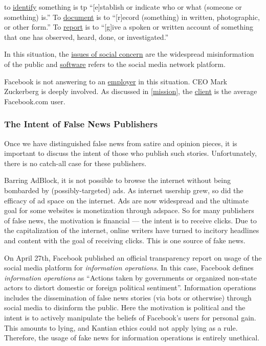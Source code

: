 to \ul{identify} something is tp ``[e]stablish or indicate who or what (someone or something) is.'' \cite{oxford} To \ul{document} is to ``[r]ecord (something) in written, photographic, or other form.'' \cite{oxford} To \ul{report} is to ``[g]ive a spoken or written account of something that one has observed, heard, done, or investigated.'' \cite{oxford}

\par In this situation, the \ul{issues of social concern} are the widespread misinformation of the public and \ul{software} refers to the social media network platform.

\par Facebook is not answering to an \ul{employer} in this situation. CEO Mark Zuckerberg is deeply involved. As discussed in \ref{mission}, the \ul{client} is the average Facebook.com user. 





\subsubsection{The Intent of False News Publishers}

\par Once we have distinguished false news from satire and opinion pieces, it is important to discuss the intent of those who publish such stories. Unfortunately, there is no catch-all case for these publishers.

\par Barring AdBlock, it is not possible to browse the internet without being bombarded by (possibly-targeted) ads. As internet usership grew, so did the efficacy of ad space on the internet. Ads are now widespread and the ultimate goal for some websites is monetization through adspace. \cite{bbc_clickbait} So for many publishers of false news, the motivation is financial --- the intent is to receive clicks. Due to the capitalization of the internet, online writers have turned to incitory headlines and content with the goal of receiving clicks. This is one source of fake news.

\par On April 27th, Facebook published an official transparency report on usage of the social media platform for \emph{information operations}. In this case, Facebook defines \emph{information operations} as ``Actions taken by governments or organized non-state actors to distort domestic or foreign political sentiment''. \cite{fb_info_ops} Information operations includes the dissemination of false news stories (via bots or otherwise) through social media to disinform the public. Here the motivation is political and the intent is to actively manipulate the beliefs of Facebook's users for personal gain. This amounts to lying, and Kantian ethics could not apply lying as a rule. \cite{kant} Therefore, the usage of fake news for information operations is entirely unethical.

